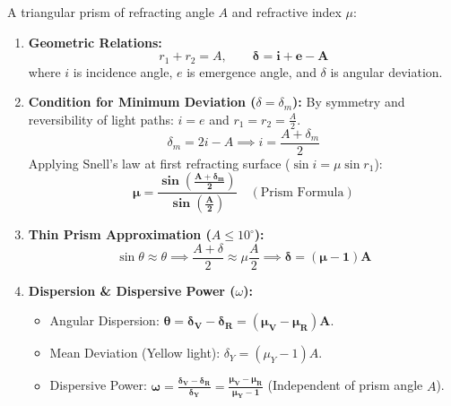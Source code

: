 \documentclass[10pt,a4paper]{article}
\begin{document}
\begin{formulabox}
A triangular prism of refracting angle $A$ and refractive index $\mu$:
\begin{enumerate}
  \item \textbf{Geometric Relations:}
  \begin{equation}
    r_1 + r_2 = A, \qquad \mathbf{\delta = i + e - A}
  \end{equation}
  where $i$ is incidence angle, $e$ is emergence angle, and $\delta$ is angular deviation.
  \item \textbf{Condition for Minimum Deviation ($\delta = \delta_m$):}
  By symmetry and reversibility of light paths: $i = e$ and $r_1 = r_2 = \frac{A}{2}$.
  \begin{equation}
    \delta_m = 2i - A \implies i = \frac{A + \delta_m}{2}
  \end{equation}
  Applying Snell's law at first refracting surface ($\sin i = \mu \sin r_1$):
  \begin{equation}
    \mathbf{\mu = \frac{\sin\left(\frac{A + \delta_m}{2}\right)}{\sin\left(\frac{A}{2}\right)}} \quad (\text{Prism Formula})
  \end{equation}
  \item \textbf{Thin Prism Approximation ($A \le 10^\circ$):}
  \begin{equation}
    \sin\theta \approx \theta \implies \frac{A + \delta}{2} \approx \mu \frac{A}{2} \implies \mathbf{\delta = (\mu - 1) A}
  \end{equation}
  \item \textbf{Dispersion \& Dispersive Power ($\omega$):}
  \begin{itemize}
    \item Angular Dispersion: $\mathbf{\theta = \delta_V - \delta_R = (\mu_V - \mu_R) A}$.
    \item Mean Deviation (Yellow light): $\delta_Y = (\mu_Y - 1) A$.
    \item Dispersive Power: $\mathbf{\omega = \frac{\delta_V - \delta_R}{\delta_Y} = \frac{\mu_V - \mu_R}{\mu_Y - 1}}$ (Independent of prism angle $A$).
  \end{itemize}
\end{enumerate}
\end{formulabox}
\end{document}
